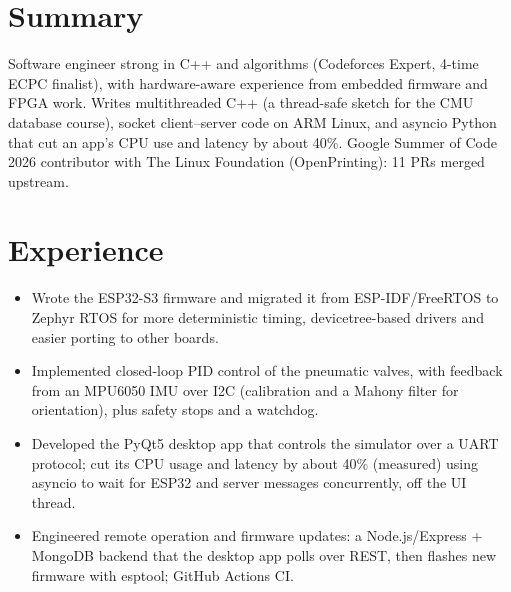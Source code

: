 \documentclass[10pt]{article}
\begin{document}

\section*{Summary}
Software engineer strong in C++ and algorithms (Codeforces Expert, 4-time ECPC finalist), with hardware-aware experience from embedded firmware and FPGA work. Writes multithreaded C++ (a thread-safe sketch for the CMU database course), socket client--server code on ARM Linux, and asyncio Python that cut an app's CPU use and latency by about 40\%. Google Summer of Code 2026 contributor with The Linux Foundation (OpenPrinting): 11 PRs merged upstream.

\section*{Experience}
\begin{itemize}
  \item Wrote the ESP32-S3 firmware and migrated it from ESP-IDF/FreeRTOS to Zephyr RTOS for more deterministic timing, devicetree-based drivers and easier porting to other boards.
  \item Implemented closed-loop PID control of the pneumatic valves, with feedback from an MPU6050 IMU over I2C (calibration and a Mahony filter for orientation), plus safety stops and a watchdog.
  \item Developed the PyQt5 desktop app that controls the simulator over a UART protocol; cut its CPU usage and latency by about 40\% (measured) using asyncio to wait for ESP32 and server messages concurrently, off the UI thread.
  \item Engineered remote operation and firmware updates: a Node.js/Express + MongoDB backend that the desktop app polls over REST, then flashes new firmware with esptool; GitHub Actions CI.
\end{itemize}
\end{document}
